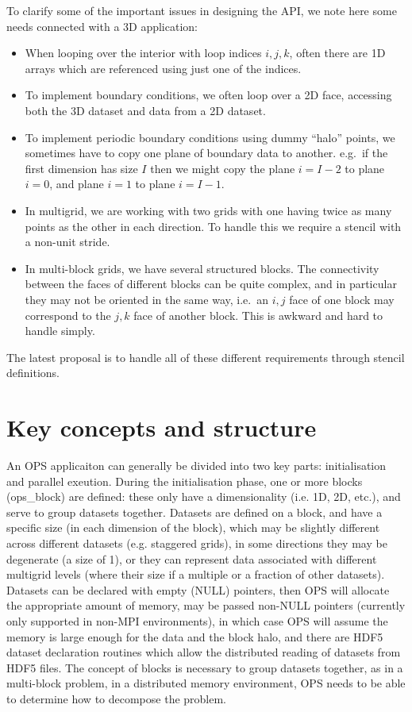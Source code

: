 \documentclass[11pt]{article}
\begin{document}
\noindent To clarify some of the important issues in designing the API, we note here some needs connected with a 3D
application:
\begin{itemize}
\item
When looping over the interior with loop indices $i,j,k$, often there are 1D arrays which are referenced using just one 
of the indices.

\item
To implement boundary conditions, we often loop over a 2D face, accessing both the 3D dataset and data from a 2D 
dataset.

\item
To implement periodic boundary conditions using dummy ``halo'' points, we sometimes have to copy one plane of boundary 
data to another.  e.g.~if the first dimension has size $I$ then we might copy the plane $i=I\!-\!2$ to plane $i=0$, and 
plane $i=1$ to plane $i=I\!-\!1$.

\item
In multigrid, we are working with two grids with one having twice as many points as the other in each direction.  To 
handle this we require a stencil with a non-unit stride.

\item
In multi-block grids, we have several structured blocks. The connectivity between the faces of different blocks can 
be quite complex, and in particular they may not be oriented in the same way, i.e.~an $i,j$ face of one block may 
correspond to the $j,k$ face of another block.  This is awkward and hard to handle simply.
\end{itemize}

\noindent The latest proposal is to handle all of these different requirements through stencil definitions.

\section{Key concepts and structure}

An OPS applicaiton can generally be divided into two key parts: initialisation and parallel exeution. During the 
initialisation phase, one or more blocks (ops\_block) are defined: these only have a dimensionality (i.e. 1D, 2D,
etc.), and serve to group datasets together. Datasets are defined on a block, and have a specific size (in each dimension of the block), which may be
slightly different across different datasets (e.g. staggered grids), in some directions they may be degenerate (a
 size of 1), or they can represent data associated with different multigrid levels (where their size if a multiple or
a fraction of other datasets). Datasets can be declared with empty (NULL) pointers, then OPS will allocate the appropriate
amount of memory, may be passed non-NULL pointers (currently only supported in non-MPI environments), in which case OPS will
assume the memory is large enough for the data and the block halo, and there are HDF5 dataset declaration routines which
allow the distributed reading of datasets from HDF5 files. The concept of blocks is necessary to group datasets together, 
as in a multi-block problem, in a distributed memory environment, OPS needs to be able to determine how to decompose the problem.
\end{document}
